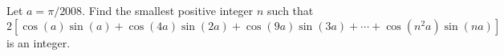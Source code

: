 Let $ a=\pi/2008$. Find the smallest positive integer $ n$ such that
\[ 2[\cos(a)\sin(a)+\cos(4a)\sin(2a)+\cos(9a)\sin(3a)+\cdots+\cos(n^2a)\sin(na)]\] is an integer.